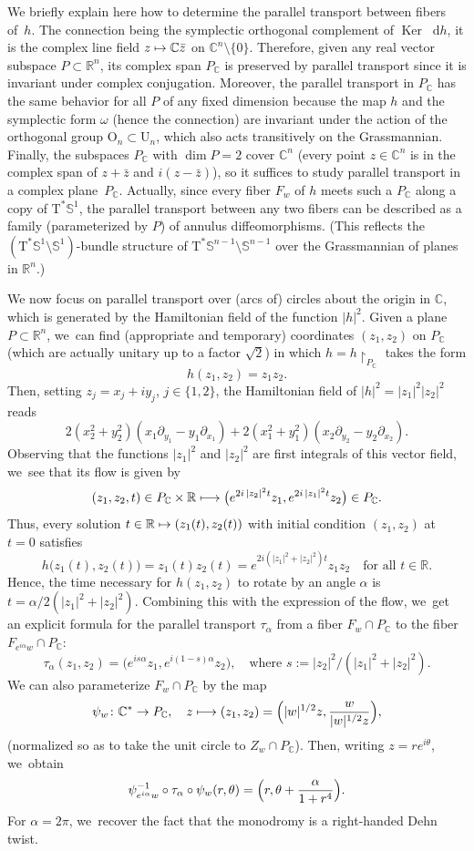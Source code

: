 \documentclass[JEP,XML,SOM,Unicode]{cedram}
\newcommand\mto{\mathchoice{\longmapsto}{\mapsto}{\mapsto}{\mapsto}}
\newcommand{\C}{{\mathbb C}}
\newcommand{\R}{{\mathbb R}}
\newcommand{\bS}{{\mathbb S}}
\renewcommand{\O}{{\mathrm{O}}}
\newcommand{\U}{{\mathrm{U}}}
\newcommand{\Ker}{\operatorname{Ker}}
\newcommand{\sT}{\mathrm{T}^\ast}
\renewcommand{\d}{\mathop{}\!\mathrm d}
\renewcommand{\dh}{\d h}
\newcommand{\de}{\mathrel{:=}}
\newcommand{\rst}[1]{{\upharpoonright}_{\!#1}}
\let\del\partial
\let\on\colon
\theoremstyle{plain}
\theoremstyle{definition}
\begin{document}
We briefly explain here how to determine the parallel transport between fibers
of~$h$. The connection being the symplectic orthogonal complement of $\Ker \dh$,
it is the complex line field $z \mto \C \bar z$ on $\C^n \setminus \{0\}$. Therefore,
given any real vector subspace $P \subset \R^n$, its complex span $P_\C$ is
preserved by parallel transport since it is invariant under complex conjugation.
Moreover, the parallel transport in $P_\C$ has the same behavior for all $P$ of
any fixed dimension because the map $h$ and the symplectic form $\omega$ (hence
the connection) are invariant under the action of the orthogonal group $\O_n
\subset \U_n$, which also acts transitively on the Grassmannian. Finally, the
subspaces $P_\C$ with $\dim P = 2$ cover $\C^n$ (every point $z \in \C^n$ is in
the complex span of $z + \bar z$ and $i (z - \bar z)$), so it suffices to study
parallel transport in a complex plane~$P_\C$. Actually, since every fiber $F_w$
of $h$ meets such a $P_\C$ along a copy of $\sT\bS^1$, the parallel transport
between any two fibers can be described as a family (parameterized by $P$) of
annulus diffeomorphisms. (This reflects the $(\sT\bS^1 \setminus \bS^1)$-bundle structure
of $\sT\bS^{n-1} \setminus \bS^{n-1}$ over the Grassmannian of planes in $\R^n$.)

We now focus on parallel transport over (arcs of) circles about the origin in
$\C$, which is generated by the Hamiltonian field of the function $|h|^2$. Given
a plane \hbox{$P \subset \R^n$}, we~can find (appropriate and temporary) coordinates
$(z_1,z_2)$ on $P_\C$ (which are actually unitary up to a factor $\sqrt2$) in
which $h = h \rst{ P_\C }$ takes the form
\[
h(z_1,z_2) = z_1z_2.
\]
Then, setting $z_j = x_j+iy_j$, $j \in \{1,2\}$, the Hamiltonian field of $|h|^2
= |z_1|^2 |z_2|^2$ reads
\[
2(x_2^2+y_2^2) (x_1 \del_{y_1} - y_1 \del_{x_1})
 + 2(x_1^2+y_1^2) (x_2 \del_{y_2} - y_2 \del_{x_2}).
\]
Observing that the functions $|z_1|^2$ and $|z_2|^2$ are first integrals of this
vector field, we~see that its flow is given by
\[
(z_1,z_2, t) \in P_\C \times \R \mto
 \bigl(e^{2i\,|z_2|^2t} z_1, e^{2i\,|z_1|^2t} z_2\bigr) \in P_\C.
\]
Thus, every solution $t \in \R \mto (z_1(t),z_2(t))$ with initial condition
$(z_1,z_2)$ at $t=0$ satisfies
\[
h \bigl(z_1(t),z_2(t)\bigr) = z_1(t) z_2(t)
 = e^{2i(|z_1|^2+|z_2|^2)t} z_1z_2 \quad \text{for all $t \in \R$.}
\]
Hence, the time necessary for $h(z_1,z_2)$ to rotate by an angle $\alpha$ is $t
= \alpha/2(|z_1|^2+|z_2|^2)$. Combining this with the expression of the flow, we~get an explicit formula for the parallel transport $\tau_\alpha$ from a fiber
$F_w \cap P_\C$ to the fiber $F_{e^{i\alpha}w} \cap P_\C$:
\[
\tau_\alpha (z_1,z_2) = \bigl(e^{is\alpha} z_1, e^{i(1-s)\alpha} z_2\bigr),
 \quad \text{where $s \de |z_2|^2 / (|z_1|^2+|z_2|^2)$.}
\]
We can also parameterize $F_w \cap P_\C$ by the map
\[
\psi_w \on \C^* \to P_\C, \quad
 z \mto (z_1,z_2) =
 \Bigl(|w|^{1/2} z, \frac{w}{|w|^{1/2} z}\Bigr),
\]
(normalized so as to take the unit circle to $Z_w \cap P_\C$). Then, writing $z
= re^{i\theta}$, we~obtain
\[
\psi_{e^{i\alpha}w}^{-1} \circ \tau_\alpha \circ \psi_w (r,\theta)
 = \Bigl(r, \theta + \frac{\alpha}{1+r^4}\Bigr).
\]
For $\alpha = 2\pi$, we~recover the fact that the monodromy is a right-handed
Dehn twist.
\end{document}
